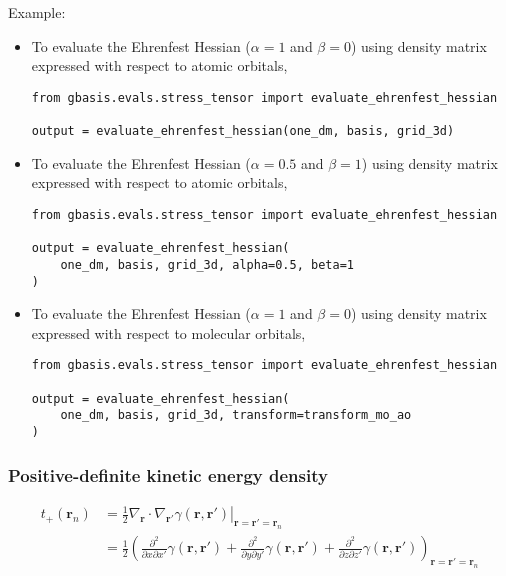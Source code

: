 \documentclass[letterpaper]{article}
\begin{document}
Example:
\begin{itemize}
\item To evaluate the Ehrenfest Hessian ($\alpha=1$ and $\beta=0$)
  using density matrix expressed with respect to atomic orbitals,
  \begin{lstlisting}[xleftmargin=-25pt]
from gbasis.evals.stress_tensor import evaluate_ehrenfest_hessian

output = evaluate_ehrenfest_hessian(one_dm, basis, grid_3d)
\end{lstlisting}
\item To evaluate the Ehrenfest Hessian ($\alpha=0.5$ and $\beta=1$)
  using density matrix expressed with respect to atomic orbitals,
  \begin{lstlisting}[xleftmargin=-25pt]
from gbasis.evals.stress_tensor import evaluate_ehrenfest_hessian

output = evaluate_ehrenfest_hessian(
    one_dm, basis, grid_3d, alpha=0.5, beta=1
)
\end{lstlisting}
\item To evaluate the Ehrenfest Hessian ($\alpha=1$ and $\beta=0$)
  using density matrix expressed with respect to molecular orbitals,
  \begin{lstlisting}[xleftmargin=-25pt]
from gbasis.evals.stress_tensor import evaluate_ehrenfest_hessian

output = evaluate_ehrenfest_hessian(
    one_dm, basis, grid_3d, transform=transform_mo_ao
)
\end{lstlisting}
\end{itemize}
\subsubsection{Positive-definite kinetic energy density}
\begin{equation}
  \begin{split}
    t_+ (\mathbf{r}_n)
    &= \frac{1}{2} \left.
      \nabla_{\mathbf{r}} \cdot \nabla_{\mathbf{r}'} \gamma(\mathbf{r}, \mathbf{r}')
    \right|_{\mathbf{r} = \mathbf{r}' = \mathbf{r}_n}\\
    &= \frac{1}{2} \left(
      \frac{\partial^2}{\partial x \partial x'} \gamma(\mathbf{r}, \mathbf{r}')
      + \frac{\partial^2}{\partial y \partial y'} \gamma(\mathbf{r}, \mathbf{r}')
      + \frac{\partial^2}{\partial z \partial z'} \gamma(\mathbf{r}, \mathbf{r}')
    \right)_{\mathbf{r} = \mathbf{r}' = \mathbf{r}_n}\\
  \end{split}
\end{equation}
\end{document}
